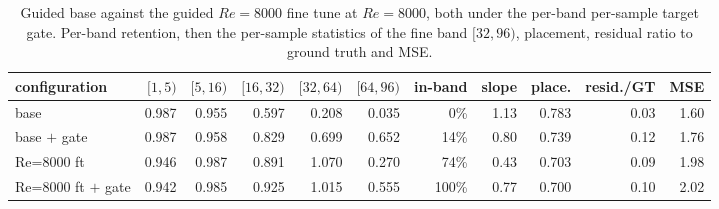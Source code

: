 \begin{table}[H]
  \centering
  \caption{Guided base against the guided $Re{=}8000$ fine tune at $Re{=}8000$, both under the per-band per-sample target gate. Per-band retention, then the per-sample statistics of the fine band $[32,96)$, placement, residual ratio to ground truth and MSE.}
  \label{tab:re8k-gate-basevsft}
  \begin{tabular}{lrrrrrrrrrr}
    \toprule
    configuration & $[1,5)$ & $[5,16)$ & $[16,32)$ & $[32,64)$ & $[64,96)$ & in-band & slope & place. & resid./GT & MSE \\
    \midrule
    base & 0.987 & 0.955 & 0.597 & 0.208 & 0.035 & 0\% & 1.13 & 0.783 & 0.03 & 1.60 \\
    base $+$ gate & 0.987 & 0.958 & 0.829 & 0.699 & 0.652 & 14\% & 0.80 & 0.739 & 0.12 & 1.76 \\
    \midrule
    Re=8000 ft & 0.946 & 0.987 & 0.891 & 1.070 & 0.270 & 74\% & 0.43 & 0.703 & 0.09 & 1.98 \\
    Re=8000 ft $+$ gate & 0.942 & 0.985 & 0.925 & 1.015 & 0.555 & 100\% & 0.77 & 0.700 & 0.10 & 2.02 \\
    \bottomrule
  \end{tabular}
\end{table}
